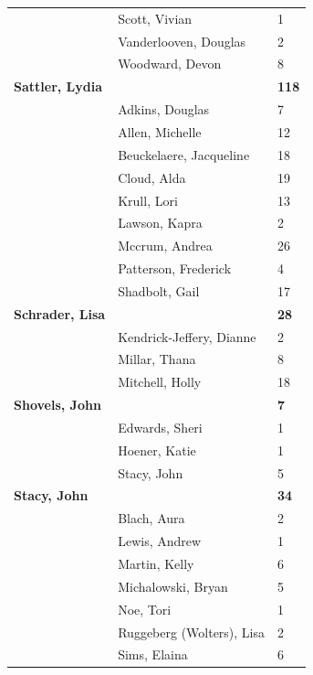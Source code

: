 \documentclass{article}\usepackage[]{graphicx}\usepackage[]{color}
\begin{document}
{\begin{longtable} { >{\raggedright}p{}|p{}p{}}
   & Scott, Vivian & 1 \\ 
   & Vanderlooven, Douglas & 2 \\ 
   \rowcolor[gray]{0.90} & Woodward, Devon & 8 \\ 
   \rowcolor[gray]{0.90}\textbf{Sattler, Lydia} &  & \hspace{2cm}\textbf{118} \\ 
   \rowcolor[gray]{0.90} & Adkins, Douglas & 7 \\ 
   & Allen, Michelle & 12 \\ 
   & Beuckelaere, Jacqueline & 18 \\ 
   & Cloud, Alda & 19 \\ 
   \rowcolor[gray]{0.90} & Krull, Lori & 13 \\ 
   \rowcolor[gray]{0.90} & Lawson, Kapra & 2 \\ 
   \rowcolor[gray]{0.90} & Mccrum, Andrea & 26 \\ 
   & Patterson, Frederick & 4 \\ 
   & Shadbolt, Gail & 17 \\ 
  \textbf{Schrader, Lisa} &  & \hspace{2cm}\textbf{28} \\ 
   \rowcolor[gray]{0.90} & Kendrick-Jeffery, Dianne & 2 \\ 
   \rowcolor[gray]{0.90} & Millar, Thana & 8 \\ 
   \rowcolor[gray]{0.90} & Mitchell, Holly & 18 \\ 
  \textbf{Shovels, John} &  & \hspace{2cm}\textbf{7} \\ 
   & Edwards, Sheri & 1 \\ 
   & Hoener, Katie & 1 \\ 
   \rowcolor[gray]{0.90} & Stacy, John & 5 \\ 
   \rowcolor[gray]{0.90}\textbf{Stacy, John} &  & \hspace{2cm}\textbf{34} \\ 
   \rowcolor[gray]{0.90} & Blach, Aura & 2 \\ 
   & Lewis, Andrew & 1 \\ 
   & Martin, Kelly & 6 \\ 
   & Michalowski, Bryan & 5 \\ 
   \rowcolor[gray]{0.90} & Noe, Tori & 1 \\ 
   \rowcolor[gray]{0.90} & Ruggeberg (Wolters), Lisa & 2 \\ 
   \rowcolor[gray]{0.90} & Sims, Elaina & 6 \\ 

\end{longtable}}
\end{document}
